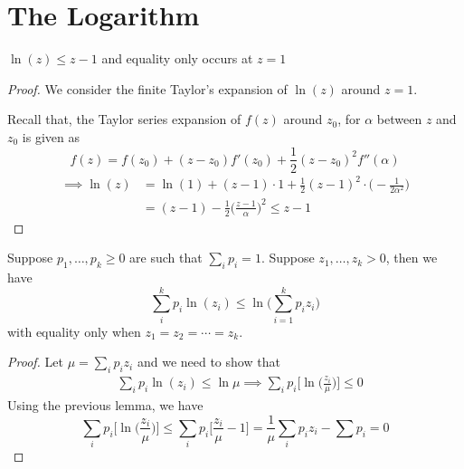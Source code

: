 \section{The Logarithm}
\begin{lemma}
$\ln(z) \leq z-1$ and equality only occurs at $z=1$
\end{lemma}
\begin{proof}
We consider the finite Taylor's expansion of $\ln(z)$ around $z=1$. \\
\begin{minipage}{0.6\textwidth}
Recall that, the Taylor series expansion of $f(z)$ around $z_0$, for $\alpha$ between $z$ and $z_0$ is given as
\[f(z) = f(z_0) + (z-z_0)f'(z_0) + \frac{1}{2}(z-z_0)^2 f''(\alpha) \]
\begin{align*}
   \implies \ln(z) &= \ln(1) + (z-1) \cdot 1 + \frac{1}{2} (z-1)^2 \cdot \bigg(-\frac{1}{2\alpha^2}\bigg) \\
    &= (z-1) - \frac{1}{2}\bigg(\frac{z-1}{\alpha}\bigg)^2 \leq z-1
\end{align*}

\end{minipage}
\hspace{0.1\textwidth}
\begin{minipage}{0.3\textwidth}
\end{minipage}
\end{proof}
\begin{corollary}
Suppose $p_1, \dots, p_k \geq 0$ are such that $\sum_i p_i = 1$. Suppose $z_1, \dots, z_k > 0$, then we have
\[\sum_i^k p_i \ln(z_i) \leq \ln\bigg(\sum_{i=1}^k p_iz_i\bigg)\]
with equality only when $z_1 = z_2 = \cdots = z_k$.
\end{corollary}
\begin{proof}
Let $\mu = \sum_i p_i z_i$ and we need to show that 
\begin{align*}
&\sum_i p_i \ln(z_i) \leq \ln \mu \implies \sum_i p_i \bigg[\ln\Big(\frac{z_i}{\mu}\Big)\bigg] \leq 0
\end{align*}
Using the previous lemma, we have
\[\sum_i p_i \bigg[\ln\Big(\frac{z_i}\mu\Big)\bigg] \leq \sum_i p_i \bigg[\frac{z_i}{\mu} - 1\bigg] = \frac{1}{\mu} \sum_i{p_iz_i} - \sum p_i = 0\]
\end{proof}
